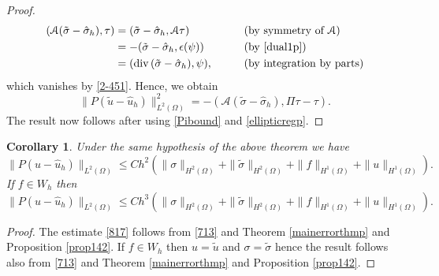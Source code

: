 \documentclass[12pt]{amsart}
\numberwithin{equation}{section}
\newtheorem{corollary}[theorem]{Corollary}
\theoremstyle{definition}
\theoremstyle{remark}
\renewcommand{\(}{\bigl(}
\renewcommand{\)}{\bigr)}
\newcommand{\uu}{\hat{u}}  %
\newcommand{\ssigma}{\hat{\sigma}}   %
\newcommand{\tsigma}{\tilde{\sigma}}
\newcommand{\tu}{\tilde{u}}
\newcommand{\dive}{{\ensuremath\mathop{\mathrm{div}\,}}} %
\newcommand{\Aa}{\mathcal{A}}
\newcommand{\revj}[1]{{\color{black}#1}}
\begin{document}
\begin{proof}
\begin{alignat*}{2}
( \mathcal{A} (\tsigma-\ssigma_h),  \tau)& = ( \tsigma-\ssigma_h, \mathcal{A} \tau) \qquad && \text{(by symmetry of  $\Aa$)} \\
& = - (\tsigma-\ssigma_h, \epsilon(\revj{\psi})) \qquad && \text{(by  \eqref{dual1p})} \\
& = ( \dive(\tsigma-\ssigma_h), \revj{\psi}), \qquad && \text{(by integration by parts)}  
\end{alignat*}
which vanishes by \eqref{2-451}. Hence, we obtain 
\begin{equation*}
    \| P(\tu-\uu_h)\|_{L^2(\Omega)}^2=  -( \mathcal{A}(\tsigma-\ssigma_h), \Pi \tau- \tau).
\end{equation*}
The result now follows after using \eqref{Pibound} and \eqref{ellipticregp}.
\end{proof}

%

\begin{corollary}
  \label{cor:pw-const-superconvergence}
Under the same hypothesis of the above theorem we have
\begin{equation}\label{817}
 \| P(u-\uu_h)\|_{L^2(\Omega)} \le C h^2 (\|\sigma\|_{H^2(\Omega)}+ \|\tsigma\|_{H^2(\Omega)}+ \|f\|_{H^1(\Omega)}+ \|u\|_{H^1(\Omega)}).
\end{equation}
If $f \in W_h$ then  
\begin{equation}\label{814}
 \| P(u-\uu_h)\|_{L^2(\Omega)} \le C h^3 (\|\sigma\|_{H^2(\Omega)}+ \|\tsigma\|_{H^2(\Omega)}+ \|f\|_{H^1(\Omega)}+ \|u\|_{H^1(\Omega)}).
\end{equation}
\end{corollary}

\begin{proof}
The estimate \eqref{817} follows from \eqref{713} and Theorem \ref{mainerrorthmp} and Proposition \ref{prop142}. If $f \in W_h$ then $u=\tu$ and $\sigma=\tsigma$ hence the result follows also from \eqref{713} and Theorem \ref{mainerrorthmp} and Proposition \ref{prop142}.
\end{proof}
\end{document}
